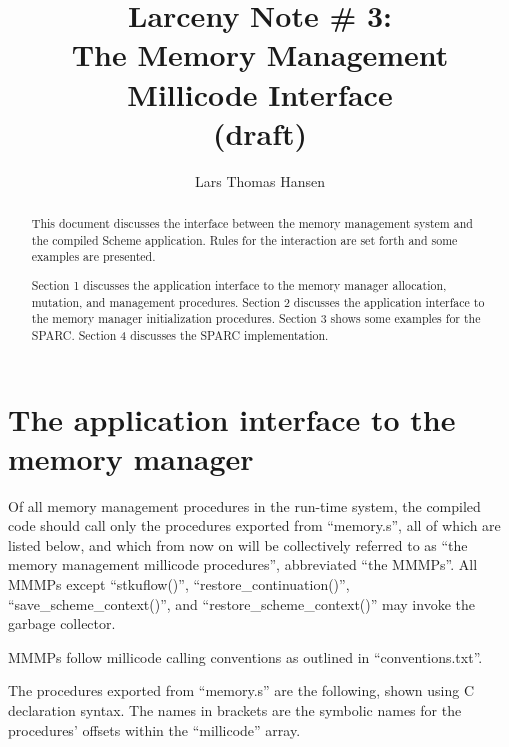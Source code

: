 


\title{Larceny Note \# 3: \\
       The Memory Management Millicode Interface \\
       {\tenrm (draft)}}
\author{Lars Thomas Hansen}


\maketitle
\begin{abstract}
This document discusses the interface between the memory management system
and the compiled Scheme application. Rules for the interaction are set
forth and some examples are presented. 

Section 1 discusses the application interface to the memory manager
allocation, mutation, and management procedures.  Section 2 discusses
the application interface to the memory manager initialization
procedures.  Section 3 shows some examples for the SPARC. Section 4
discusses the SPARC implementation.


\end{abstract}


\section{The application interface to the memory manager}

Of all memory management procedures in the run-time system, the
compiled code should call only the procedures exported from
``memory.s'', all of which are listed below, and which from now on will
be collectively referred to as ``the memory management millicode
procedures'', abbreviated ``the MMMPs''. All MMMPs except ``stkuflow()'',
``restore\_continuation()'', ``save\_scheme\_context()'', and
``restore\_scheme\_context()'' may invoke the garbage collector.

MMMPs follow millicode calling conventions as outlined in
``conventions.txt''.

The procedures exported from ``memory.s'' are the following, shown using
C declaration syntax. The names in brackets are the symbolic names for
the procedures' offsets within the ``millicode'' array.


